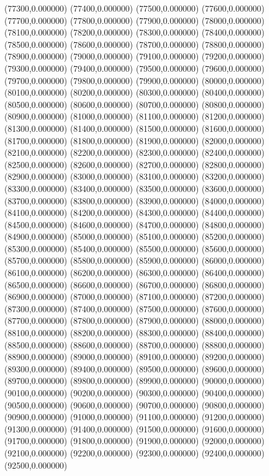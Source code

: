 (77300,0.000000)
(77400,0.000000)
(77500,0.000000)
(77600,0.000000)
(77700,0.000000)
(77800,0.000000)
(77900,0.000000)
(78000,0.000000)
(78100,0.000000)
(78200,0.000000)
(78300,0.000000)
(78400,0.000000)
(78500,0.000000)
(78600,0.000000)
(78700,0.000000)
(78800,0.000000)
(78900,0.000000)
(79000,0.000000)
(79100,0.000000)
(79200,0.000000)
(79300,0.000000)
(79400,0.000000)
(79500,0.000000)
(79600,0.000000)
(79700,0.000000)
(79800,0.000000)
(79900,0.000000)
(80000,0.000000)
(80100,0.000000)
(80200,0.000000)
(80300,0.000000)
(80400,0.000000)
(80500,0.000000)
(80600,0.000000)
(80700,0.000000)
(80800,0.000000)
(80900,0.000000)
(81000,0.000000)
(81100,0.000000)
(81200,0.000000)
(81300,0.000000)
(81400,0.000000)
(81500,0.000000)
(81600,0.000000)
(81700,0.000000)
(81800,0.000000)
(81900,0.000000)
(82000,0.000000)
(82100,0.000000)
(82200,0.000000)
(82300,0.000000)
(82400,0.000000)
(82500,0.000000)
(82600,0.000000)
(82700,0.000000)
(82800,0.000000)
(82900,0.000000)
(83000,0.000000)
(83100,0.000000)
(83200,0.000000)
(83300,0.000000)
(83400,0.000000)
(83500,0.000000)
(83600,0.000000)
(83700,0.000000)
(83800,0.000000)
(83900,0.000000)
(84000,0.000000)
(84100,0.000000)
(84200,0.000000)
(84300,0.000000)
(84400,0.000000)
(84500,0.000000)
(84600,0.000000)
(84700,0.000000)
(84800,0.000000)
(84900,0.000000)
(85000,0.000000)
(85100,0.000000)
(85200,0.000000)
(85300,0.000000)
(85400,0.000000)
(85500,0.000000)
(85600,0.000000)
(85700,0.000000)
(85800,0.000000)
(85900,0.000000)
(86000,0.000000)
(86100,0.000000)
(86200,0.000000)
(86300,0.000000)
(86400,0.000000)
(86500,0.000000)
(86600,0.000000)
(86700,0.000000)
(86800,0.000000)
(86900,0.000000)
(87000,0.000000)
(87100,0.000000)
(87200,0.000000)
(87300,0.000000)
(87400,0.000000)
(87500,0.000000)
(87600,0.000000)
(87700,0.000000)
(87800,0.000000)
(87900,0.000000)
(88000,0.000000)
(88100,0.000000)
(88200,0.000000)
(88300,0.000000)
(88400,0.000000)
(88500,0.000000)
(88600,0.000000)
(88700,0.000000)
(88800,0.000000)
(88900,0.000000)
(89000,0.000000)
(89100,0.000000)
(89200,0.000000)
(89300,0.000000)
(89400,0.000000)
(89500,0.000000)
(89600,0.000000)
(89700,0.000000)
(89800,0.000000)
(89900,0.000000)
(90000,0.000000)
(90100,0.000000)
(90200,0.000000)
(90300,0.000000)
(90400,0.000000)
(90500,0.000000)
(90600,0.000000)
(90700,0.000000)
(90800,0.000000)
(90900,0.000000)
(91000,0.000000)
(91100,0.000000)
(91200,0.000000)
(91300,0.000000)
(91400,0.000000)
(91500,0.000000)
(91600,0.000000)
(91700,0.000000)
(91800,0.000000)
(91900,0.000000)
(92000,0.000000)
(92100,0.000000)
(92200,0.000000)
(92300,0.000000)
(92400,0.000000)
(92500,0.000000)
